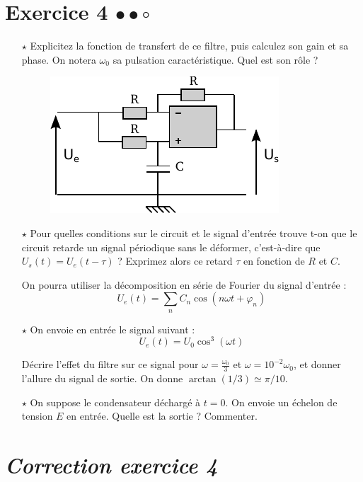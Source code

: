 \documentclass{report}
\begin{document}
\section*{Exercice 4 $\bullet\bullet\circ$}
\begin{itemize}
\item[$\star$] Explicitez la fonction de transfert de ce filtre, puis calculez son gain et sa phase. On notera $\omega_0$ sa pulsation caractéristique. Quel est son rôle ?
\begin{figure}[!h]
\centering
\includegraphics[width=0.5\linewidth]{circuit_.pdf}
\end{figure}

\item[$\star$]
Pour quelles conditions sur le circuit et le signal d'entrée trouve t-on que le circuit retarde un signal périodique sans le déformer, c'est-à-dire que $U_{s}(t)=U_{e}(t-\tau)$ ? Exprimez alors ce retard $\tau$ en fonction de $R$ et $C$.

On pourra utiliser la décomposition en série de Fourier du signal d'entrée :
\begin{equation}
U_e(t) = \sum_n C_n\cos(n\omega t + \varphi_n)
\end{equation}

\item[$\star$] On envoie en entrée le signal suivant :
\begin{equation}
U_{e}(t) = U_{0}\cos^{3}(\omega t)
\end{equation}

Décrire l'effet du filtre sur ce signal pour $\omega = \frac{\omega_{0}}{3}$ et $\omega=10^{-2}\omega_0$, et donner l'allure du signal de sortie. On donne $\arctan(1/3)\simeq\pi/10$.

\item[$\star$]
On suppose le condensateur déchargé à $t=0$. On envoie un échelon de tension $E$ en entrée. Quelle est la sortie ? Commenter.
\end{itemize}

\newpage

\section*{\textit{Correction exercice 4}}
\end{document}

